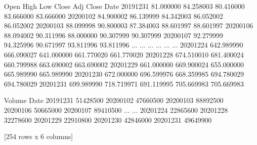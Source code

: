 \documentclass[letterpaper,10pt,english]{jupyterBook}
\begin{document}
\begin{sphinxVerbatim}[commandchars=\\\{\}]
                  Open        High         Low       Close   Adj Close  \PYGZbs{}
Date                                                                     
2019\PYGZhy{}12\PYGZhy{}31   81.000000   84.258003   80.416000   83.666000   83.666000   
2020\PYGZhy{}01\PYGZhy{}02   84.900002   86.139999   84.342003   86.052002   86.052002   
2020\PYGZhy{}01\PYGZhy{}03   88.099998   90.800003   87.384003   88.601997   88.601997   
2020\PYGZhy{}01\PYGZhy{}06   88.094002   90.311996   88.000000   90.307999   90.307999   
2020\PYGZhy{}01\PYGZhy{}07   92.279999   94.325996   90.671997   93.811996   93.811996   
...                ...         ...         ...         ...         ...   
2020\PYGZhy{}12\PYGZhy{}24  642.989990  666.090027  641.000000  661.770020  661.770020   
2020\PYGZhy{}12\PYGZhy{}28  674.510010  681.400024  660.799988  663.690002  663.690002   
2020\PYGZhy{}12\PYGZhy{}29  661.000000  669.900024  655.000000  665.989990  665.989990   
2020\PYGZhy{}12\PYGZhy{}30  672.000000  696.599976  668.359985  694.780029  694.780029   
2020\PYGZhy{}12\PYGZhy{}31  699.989990  718.719971  691.119995  705.669983  705.669983   

              Volume  
Date                  
2019\PYGZhy{}12\PYGZhy{}31  51428500  
2020\PYGZhy{}01\PYGZhy{}02  47660500  
2020\PYGZhy{}01\PYGZhy{}03  88892500  
2020\PYGZhy{}01\PYGZhy{}06  50665000  
2020\PYGZhy{}01\PYGZhy{}07  89410500  
...              ...  
2020\PYGZhy{}12\PYGZhy{}24  22865600  
2020\PYGZhy{}12\PYGZhy{}28  32278600  
2020\PYGZhy{}12\PYGZhy{}29  22910800  
2020\PYGZhy{}12\PYGZhy{}30  42846000  
2020\PYGZhy{}12\PYGZhy{}31  49649900  

[254 rows x 6 columns]
\end{sphinxVerbatim}

\begin{sphinxVerbatim}[commandchars=\\\{\}]
\end{sphinxVerbatim}
\end{document}
